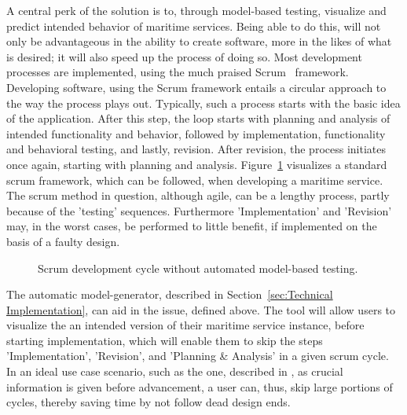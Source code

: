 A central perk of the solution is to, through model-based testing, visualize and predict intended behavior of maritime services. Being able to do this, will not only be advantageous in the ability to create software, more in the likes of what is desired; it will also speed up the process of doing so. Most development processes are implemented, using the much praised Scrum~\cite{scrum} framework. Developing software, using the Scrum framework entails a circular approach to the way the process plays out. Typically, such a process starts with the basic idea of the application. After this step, the loop starts with planning and analysis of intended functionality and behavior, followed by implementation, functionality and behavioral testing, and lastly, revision. After revision, the process initiates once again, starting with planning and analysis.
\newpage
\noindent
Figure~\ref{fig:scrumBig} visualizes a standard scrum framework, which can be followed, when developing a maritime service. The scrum method in question, although agile, can be a lengthy process, partly because of the 'testing' sequences. Furthermore 'Implementation' and 'Revision' may, in the worst cases, be performed to little benefit, if implemented on the basis of a faulty design.
\begin{figure}[h]
  \centering
  \caption{Scrum development cycle without automated model-based testing.}
  \label{fig:scrumBig}
\end{figure}

The automatic model-generator, described in Section~\ref{sec:Technical Implementation}, can aid in the issue, defined above. The tool will allow users to visualize the an intended version of their maritime service instance, before starting implementation, which will enable them to skip the steps 'Implementation', 'Revision', and 'Planning \& Analysis' in a given scrum cycle. In an ideal use case scenario, such as the one, described in %
, as crucial information is given before advancement, a user can, thus, skip large portions of cycles, thereby saving time by not follow dead design ends.

